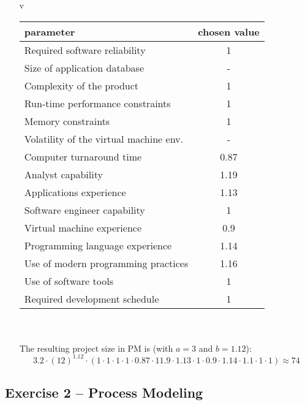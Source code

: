 \documentclass{scrartcl}
\begin{document}
\begin{itemize}
	\item[v]

	\begin{tabular}{l | c}
		parameter & chosen value \\
		\hline
		Required software reliability & 1\\
		Size of application database & -\\
		Complexity of the product & 1\\
		Run-time performance constraints  & 1\\
		Memory constraints & 1\\
		Volatility of the virtual machine env. & -\\
		Computer turnaround time & 0.87\\
		Analyst capability & 1.19\\
		Applications experience & 1.13\\
		Software engineer capability & 1\\
		Virtual machine experience & 0.9\\
		Programming language experience & 1.14\\
		Use of modern programming practices & 1.16\\
		Use of software tools & 1\\
		Required development schedule & 1\\
	\end{tabular}\\\\
	The resulting project size in PM is (with $a=3$ and $b=1.12$):
	\[3.2 \cdot (12)^{1.12}\cdot (1\cdot 1 \cdot 1 \cdot 1 \cdot 0.87 \cdot 11.9 \cdot 1.13 \cdot 1 \cdot 0.9 \cdot 1.14 \cdot 1.1 \cdot 1 \cdot 1) \approx 74\]
	
\end{itemize}

\subsection*{Exercise 2 – Process Modeling}
\end{document}
